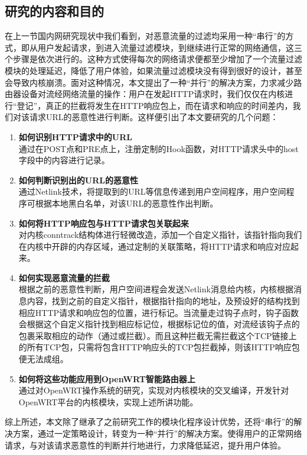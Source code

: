 \documentclass[a4paper,onecolumn,UTF8]{ctexart}
\begin{document}
\subsection{研究的内容和目的}
在上一节国内网研究现状中我们看到，对恶意流量的过滤均采用一种“串行”的方式，即从用户发起请求，到进入流量过滤模块，到继续进行正常的网络通信，这三个步骤是依次进行的。这种方式使得每次的网络请求便都至少增加了一个流量过滤模块的处理延迟，降低了用户体验，如果流量过滤模块没有得到很好的设计，甚至会导致内核崩溃。面对这种情况，本文提出了一种“并行”的解决方案，力求减少路由器设备对流经网络流量的操作：用户在发起HTTP请求时，我们仅仅在内核进行“登记”，真正的拦截将发生在HTTP响应包上，而在请求和响应的时间差内，我们对该请求URL的恶意性进行判断。这样便引出了本文要研究的几个问题：
\begin{enumerate}
  \item \textbf{如何识别HTTP请求中的URL}\\
  通过在POST点和PRE点上，注册定制的Hook函数，对HTTP请求头中的host字段中的内容进行记录。
  \item \textbf{如何判断识别出的URL的恶意性}\\
  通过Netlink技术，将提取到的URL等信息传递到用户空间程序，用户空间程序可根据本地黑白名单，对该URL的恶意性作出判断。
  \item \textbf{如何将HTTP响应包与HTTP请求包关联起来}\\
  对内核conntrack结构体进行轻微改造，添加一个自定义指针，该指针指向我们在内核中开辟的内存区域，通过定制的关联策略，将HTTP请求和响应对应起来。
  \item \textbf{如何实现恶意流量的拦截}\\
  根据之前的恶意性判断，用户空间进程会发送Netlink消息给内核，内核根据消息内容，找到之前的自定义指针，根据指针指向的地址，及预设好的结构找到相应HTTP请求和响应包的位置，进行标记。当流量走过钩子点时，钩子函数会根据这个自定义指针找到相应标记位，根据标记位的值，对流经该钩子点的包裹采取相应的动作（通过或拦截）。而且这种拦截无需拦截这个TCP链接上的所有TCP包，只需将包含HTTP响应头的TCP包拦截掉，则该HTTP响应包便无法成组。
  \item \textbf{如何将这些功能应用到OpenWRT智能路由器上}\\
  通过对OpenWRT操作系统的研究，实现对内核模块的交叉编译，开发针对OpenWRT平台的内核模块，实现上述所讲功能。
\end{enumerate}

\par 综上所述，本文除了继承了之前研究工作的模块化程序设计优势，还将“串行”的解决方案，通过一定策略设计，转变为一种“并行”的解决方案。使得用户的正常网络请求，与对该请求恶意性的判断并行地进行，力求降低延迟，提升用户体验。
\end{document}
